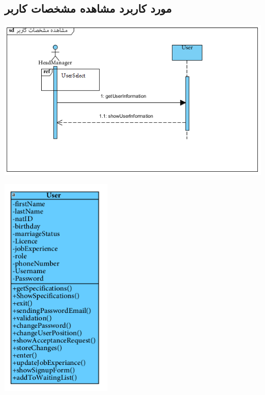 \subsection*{مورد کاربرد مشاهده مشخصات کاربر}
\vspace{2cm}
\begin{center}
\includegraphics[width=\textwidth]{SequenceDiagrams/4.png}
\end{center}

\newpage
\vspace{2cm}
\begin{center}
\includegraphics[width=0.4\textwidth]{SequenceClasses/4.png}
\end{center}

\newpage
\vspace{2cm}
